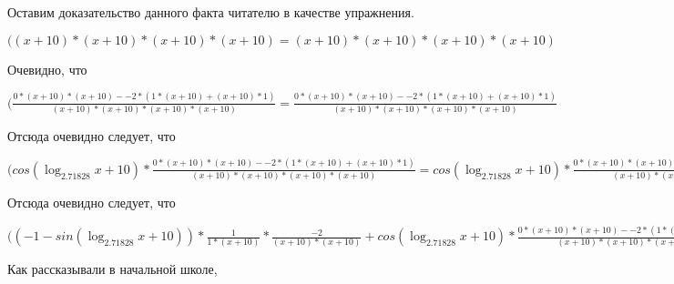 \documentclass[12pt,a4paper,fleqn]{article}
\theoremstyle{definition}
\begin{document}
Оставим доказательство данного факта читателю в качестве упражнения.

$(( x  +  10 ) * ( x  +  10 ) * ( x  +  10 ) * ( x  +  10 ) = ( x  +  10 ) * ( x  +  10 ) * ( x  +  10 ) * ( x  +  10 )$

Очевидно, что

$(\frac{ 0  * ( x  +  10 ) * ( x  +  10 ) -  -2  * ( 1  * ( x  +  10 ) + ( x  +  10 ) *  1 )}{( x  +  10 ) * ( x  +  10 ) * ( x  +  10 ) * ( x  +  10 )}
 = \frac{ 0  * ( x  +  10 ) * ( x  +  10 ) -  -2  * ( 1  * ( x  +  10 ) + ( x  +  10 ) *  1 )}{( x  +  10 ) * ( x  +  10 ) * ( x  +  10 ) * ( x  +  10 )}
$

Отсюда очевидно следует, что

$(cos(\log_{ 2.71828 }{ x  +  10 }) * \frac{ 0  * ( x  +  10 ) * ( x  +  10 ) -  -2  * ( 1  * ( x  +  10 ) + ( x  +  10 ) *  1 )}{( x  +  10 ) * ( x  +  10 ) * ( x  +  10 ) * ( x  +  10 )}
 = cos(\log_{ 2.71828 }{ x  +  10 }) * \frac{ 0  * ( x  +  10 ) * ( x  +  10 ) -  -2  * ( 1  * ( x  +  10 ) + ( x  +  10 ) *  1 )}{( x  +  10 ) * ( x  +  10 ) * ( x  +  10 ) * ( x  +  10 )}
$

Отсюда очевидно следует, что

$(( -1  - sin(\log_{ 2.71828 }{ x  +  10 })) * \frac{ 1 }{ 1  * ( x  +  10 )}
 * \frac{ -2 }{( x  +  10 ) * ( x  +  10 )}
 + cos(\log_{ 2.71828 }{ x  +  10 }) * \frac{ 0  * ( x  +  10 ) * ( x  +  10 ) -  -2  * ( 1  * ( x  +  10 ) + ( x  +  10 ) *  1 )}{( x  +  10 ) * ( x  +  10 ) * ( x  +  10 ) * ( x  +  10 )}
 = ( -1  - sin(\log_{ 2.71828 }{ x  +  10 })) * \frac{ 1 }{ 1  * ( x  +  10 )}
 * \frac{ -2 }{( x  +  10 ) * ( x  +  10 )}
 + cos(\log_{ 2.71828 }{ x  +  10 }) * \frac{ 0  * ( x  +  10 ) * ( x  +  10 ) -  -2  * ( 1  * ( x  +  10 ) + ( x  +  10 ) *  1 )}{( x  +  10 ) * ( x  +  10 ) * ( x  +  10 ) * ( x  +  10 )}
$

Как рассказывали в начальной школе,
\end{document}

